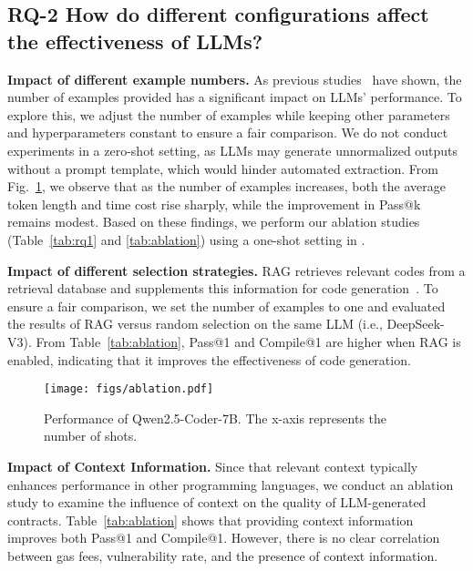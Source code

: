 \subsection{RQ-2 How do different configurations affect the effectiveness of LLMs?}
\label{sec:rq2}


\noindent 
\textbf{Impact of different example numbers.}
As previous studies~\cite{brown2020language,A3CodGen} have shown, the number of examples provided has a significant impact on LLMs' performance. 
To explore this, we adjust the number of examples while keeping other parameters and hyperparameters constant to ensure a fair comparison.
We do not conduct experiments in a zero-shot setting, as LLMs may generate unnormalized outputs without a prompt template, which would hinder automated extraction. 
From Fig.~\ref{fig:ablation}, we observe that as the number of examples increases, both the average token length and time cost rise sharply, while the improvement in Pass@k remains modest.
Based on these findings, we perform our ablation studies (Table~\ref{tab:rq1} and \ref{tab:ablation}) using a one-shot setting in \mytitle.


\noindent 
\textbf{Impact of different selection strategies.}
RAG retrieves relevant codes from a retrieval database and supplements this information for code generation~\cite{parvez2021retrieval}. 
To ensure a fair comparison, we set the number of examples to one and evaluated the results of RAG versus random selection on the same LLM (i.e., DeepSeek-V3). From Table~\ref{tab:ablation}, Pass@1 and Compile@1 are higher when RAG is enabled, indicating that it improves the effectiveness of code generation.


\begin{figure}[htbp]
    \centering
    \texttt{[image: figs/ablation.pdf]}
    \caption{Performance of Qwen2.5-Coder-7B. The x-axis represents the number of shots.}
    \label{fig:ablation}
\end{figure}
\vspace{-0.2cm}

\noindent 
\textbf{Impact of Context Information.}
Since that relevant context typically enhances performance in other programming languages, we conduct an ablation study to examine the influence of context on the quality of LLM-generated contracts. Table~\ref{tab:ablation} shows that providing context information improves both Pass@1 and Compile@1. 
However, there is no clear correlation between gas fees, vulnerability rate, and the presence of context information.


